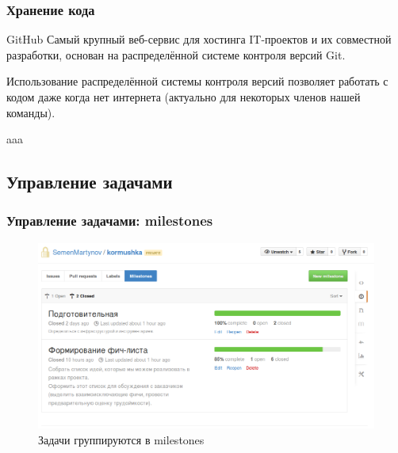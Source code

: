 \documentclass{beamer}
\begin{document}
\begin{frame}
\frametitle{Хранение кода}

\begin{block}{GitHub}
Самый крупный веб-сервис для хостинга IT-проектов и их совместной разработки, основан на распределённой системе контроля версий Git.
\end{block}

Использование распределённой системы контроля версий позволяет работать с кодом даже когда нет интернета (актуально для некоторых членов нашей команды).

aaa

\end{frame}


\subsection{Управление задачами}

\begin{frame}
\frametitle{Управление задачами: milestones}

\begin{figure}
\includegraphics[scale=0.30]{res/r1_milestones}
\caption{Задачи группируются в milestones}
\end{figure}

\end{frame}

\end{document}
